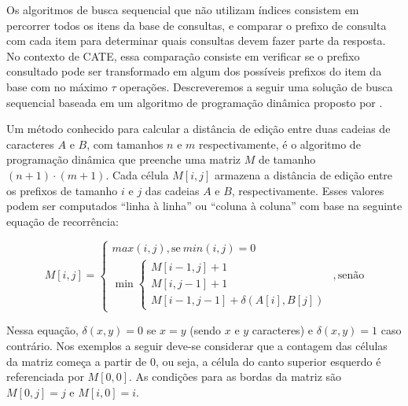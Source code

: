Os algoritmos de busca sequencial que não utilizam índices consistem em percorrer todos os itens da base de consultas, e comparar o prefixo de consulta com cada item para determinar quais consultas devem fazer parte da resposta. No contexto de CATE, essa comparação consiste em verificar se o prefixo consultado pode ser transformado em algum dos possíveis prefixos do item da base com no máximo $\tau$ operações. Descreveremos a seguir uma solução de busca sequencial baseada em um algoritmo de programação dinâmica proposto por \cite{levenshtein1966binary}. 

Um método conhecido para calcular a distância de edição entre duas cadeias de caracteres $A$ e $B$, com tamanhos $n$ e $m$ respectivamente, é o algoritmo de programação dinâmica que preenche uma matriz $M$ de tamanho $(n + 1) \cdot (m + 1)$. Cada célula $M[i,j]$ armazena a distância de edição entre os prefixos de tamanho $i$ e $j$ das cadeias $A$ e $B$, respectivamente. Esses valores podem ser computados ``linha à linha'' ou ``coluna à coluna'' com base na seguinte equação de recorrência:


\[ 
M[i,j] =
        \begin{cases}
        max(i, j), \text{se}\ min(i, j) = 0 \\
         \min
         \begin{cases}
         M[i - 1, j]  + 1 \\ 
         M[i, j - 1]  + 1 \\ 
         M[i - 1, j - 1] + \delta(A[i], B[j]) \end{cases}
         \end{cases}, \text{senão}
\]

Nessa equação, $\delta(x,y) = 0$ se $x = y$ (sendo $x$ e $y$ caracteres) e $\delta(x,y) = 1$ caso contrário. Nos exemplos a seguir deve-se considerar que a contagem das células da matriz começa a partir de $0$, ou seja, a célula do canto superior esquerdo é referenciada por $M[0,0]$. As condições para as bordas da matriz são $M[0, j] = j$ e $M[i, 0] = i$. 

